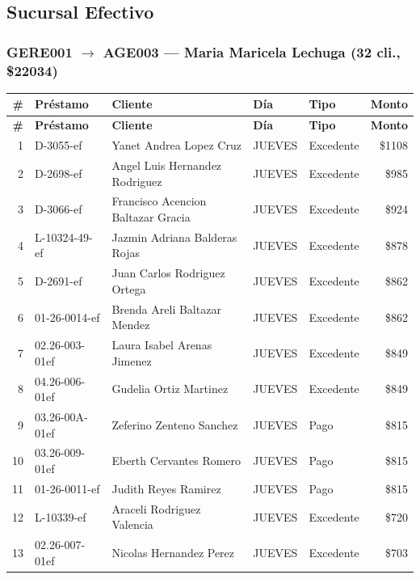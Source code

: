 \documentclass[11pt,a4paper]{article}
\newcommand{\money}[1]{\$\num{#1}}
\begin{document}
\subsection{Sucursal Efectivo}

\subsubsection{GERE001 $\rightarrow$ AGE003 --- Maria Maricela Lechuga (32 cli., \money{22034})}


\begin{center}
\renewcommand{\arraystretch}{1.1}
\footnotesize
\begin{longtable}{rlp{5.5cm}llr}
\toprule
\textbf{\#} & \textbf{Pr\'estamo} & \textbf{Cliente} & \textbf{D\'ia} & \textbf{Tipo} & \textbf{Monto} \\
\midrule
\endfirsthead
\toprule
\textbf{\#} & \textbf{Pr\'estamo} & \textbf{Cliente} & \textbf{D\'ia} & \textbf{Tipo} & \textbf{Monto} \\
\midrule
\endhead
1 & D-3055-ef & Yanet Andrea Lopez Cruz & JUEVES & Excedente & \money{1108} \\
2 & D-2698-ef & Angel Luis Hernandez Rodriguez & JUEVES & Excedente & \money{985} \\
3 & D-3066-ef & Francisco Acencion Baltazar Gracia & JUEVES & Excedente & \money{924} \\
4 & L-10324-49-ef & Jazmin Adriana Balderas Rojas & JUEVES & Excedente & \money{878} \\
5 & D-2691-ef & Juan Carlos Rodriguez Ortega & JUEVES & Excedente & \money{862} \\
6 & 01-26-0014-ef & Brenda Areli Baltazar Mendez & JUEVES & Excedente & \money{862} \\
7 & 02.26-003-01ef & Laura Isabel Arenas Jimenez & JUEVES & Excedente & \money{849} \\
8 & 04.26-006-01ef & Gudelia Ortiz Martinez & JUEVES & Excedente & \money{849} \\
9 & 03.26-00A-01ef & Zeferino Zenteno Sanchez & JUEVES & Pago & \money{815} \\
10 & 03.26-009-01ef & Eberth Cervantes Romero & JUEVES & Pago & \money{815} \\
11 & 01-26-0011-ef & Judith Reyes Ramirez & JUEVES & Pago & \money{815} \\
12 & L-10339-ef & Araceli Rodriguez Valencia & JUEVES & Excedente & \money{720} \\
13 & 02.26-007-01ef & Nicolas Hernandez Perez & JUEVES & Excedente & \money{703} \\

\end{longtable}
\end{center}
\end{document}

